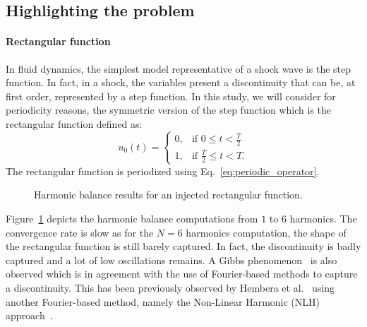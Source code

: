 

\subsection{Highlighting the problem}

\paragraph{Rectangular function}

In fluid dynamics, the simplest model 
representative of a shock wave
is the step function.
In fact, in a
shock, the variables present a discontinuity
that can be, at first order, represented by a 
step function. In this study, we will consider for periodicity reasons,
the symmetric version of the step function which is the
rectangular function defined as:
\begin{equation}
    u_0(t) = 
    \begin{cases}
        0, & \text{if } 0 \leq t < \frac{T}{2} \\
        1, & \text{if } \frac{T}{2} \leq t < T.
    \end{cases}
    \label{eq:inject_step}
\end{equation}
The rectangular function is periodized using Eq.~\eqref{eq:periodic_operator}.

\begin{figure}[htbp]
  \centering
  \caption{Harmonic balance results for 
  an injected rectangular function.}
  \label{fig:inj_step_results}
\end{figure}

Figure~\ref{fig:inj_step_results} depicts the harmonic balance
computations from $1$ to $6$ harmonics. The convergence rate 
is slow as for the $N=6$ harmonics computation, the
shape of the rectangular function is still barely captured. 
In fact, the discontinuity is badly captured and a lot of low
oscillations remains. A Gibbs
phenomenon~\cite{gibbs} is also observed which is in agreement with 
the use of Fourier-based methods to capture a discontinuity. This has been
previously observed by Hembera et al.~\cite{Hembera2009} using
another Fourier-based method, namely the Non-Linear 
Harmonic (NLH) approach~\cite{He1998}.


